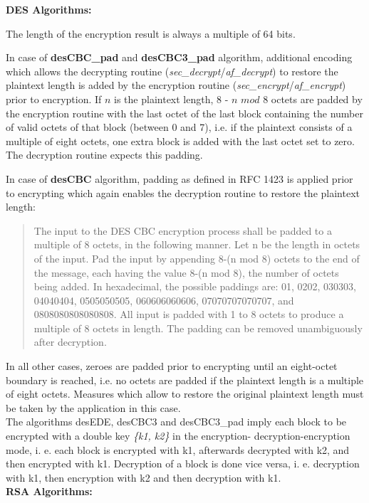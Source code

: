 {\large\bf DES Algorithms:} 
 
The length of the encryption result is always a multiple of 64 bits. 
 
In case of {\bf desCBC\_pad} and {\bf desCBC3\_pad} 
algorithm, additional encoding which allows 
the decrypting routine ({\em sec\_de\-crypt}/{\em af\_decrypt}) to restore 
the plaintext length is added 
by the encryption routine ({\em sec\_encrypt}/{\em af\_encrypt}) prior to 
encryption. 
If $n$ is the plaintext length,
8 - $n$ $mod$ 8 octets are padded by the encryption routine with
the last octet of the last block containing the number of 
valid octets of that block (between 0 and 7), i.e. if the plaintext 
consists 
of a multiple of eight octets, one extra block is added with the last octet 
set to zero. 
The decryption routine expects this padding. 
 
In case of {\bf desCBC} algorithm, 
padding as defined in RFC 1423 is applied prior to encrypting
which again enables the decryption routine to restore the plaintext length:
\begin{quote}
   The input to the DES CBC encryption process shall be padded to a
   multiple of 8 octets, in the following manner.  Let n be the length
   in octets of the input.  Pad the input by appending 8-(n mod 8)
   octets to the end of the message, each having the value 8-(n mod 8),
   the number of octets being added.  In hexadecimal, the possible
   paddings are:  01, 0202, 030303, 04040404, 0505050505, 060606060606,
   07070707070707, and 0808080808080808.  All input is padded with 1 to
   8 octets to produce a multiple of 8 octets in length.  The padding
   can be removed unambiguously after decryption.
\end{quote} 
In all other cases,
zeroes are padded prior to encrypting until an eight-octet boundary is 
reached, i.e.
no octets are padded if the plaintext length is a multiple of eight octets.
Measures which allow to restore the original plaintext length must
be taken by the application in this case.
\\ [1em]
The algorithms desEDE, desCBC3 and desCBC3\_pad imply each block
to be encrypted with a double key {\em \{k1, k2\}} in the encryption-
decryption-encryption mode,
i. e. each block is encrypted with k1, afterwards decrypted with k2, and 
then encrypted with k1.
Decryption of a block is done vice versa, i. e. decryption with k1, then 
encryption with k2
and then decryption with k1.
\\ [1em]
{\large\bf RSA Algorithms:}

